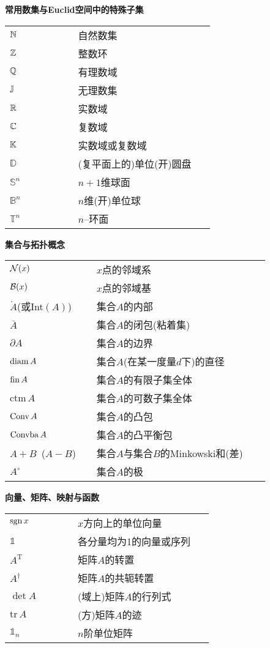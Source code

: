 \textbf{常用数集与Euclid空间中的特殊子集}
\vspace{1.5ex}

\begin{tabular}{p{0.3\linewidth}p{0.6\linewidth}}
    $\mathbb{N}$ & 自然数集\\
    $\mathbb{Z}$ & 整数环\\
    $\mathbb{Q}$ & 有理数域\\
    $\mathbb{J}$ & 无理数集\\
    $\mathbb{R}$ & 实数域\\
    $\mathbb{C}$ & 复数域\\
    $\mathbb{K}$ & 实数域或复数域\\
    $\mathbb{D}$ & (复平面上的)单位(开)圆盘\\
    $\mathbb{S}^n$ & $n+1$维球面\\
    $\mathbb{B}^n$ & $n$维(开)单位球\\
    $\mathbb{T}^n$ & $n$--环面\\
\end{tabular}

\vspace{2.5ex}
\noindent\textbf{集合与拓扑概念}
\vspace{1.5ex}

\begin{tabular}{p{0.3\linewidth}p{0.6\linewidth}}
    $\mathcal{N}(x)$ & $x$点的邻域系\\
    $\mathcal{B}(x)$ & $x$点的邻域基\\
    $\mathring{A}$(或Int$(A)$) & 集合$A$的内部\\
    $\bar{A}$ & 集合$A$的闭包(粘着集)\\
    $\partial A$ & 集合$A$的边界\\
    $\operatorname{diam} A$ & 集合$A$(在某一度量$d$下)的直径\\
    $\operatorname{fin} A$ & 集合$A$的有限子集全体\\
    $\text{ctm}\, A$ & 集合$A$的可数子集全体\\
    $\operatorname{Conv} A$ & 集合$A$的凸包\\
    $\operatorname{Convba} A$ & 集合$A$的凸平衡包\\
    $A+B$\ ($A-B$) & 集合$A$与集合$B$的Minkowski和(差)\\
    $A^\circ$ & 集合$A$的极\\
\end{tabular}

\vspace{2.5ex}
\noindent\textbf{向量、矩阵、映射与函数}
\vspace{1.5ex}

\begin{tabular}{p{0.3\linewidth}p{0.6\linewidth}}
    $\mathrm{sgn}\, x$ & $x$方向上的单位向量\\
    $\mathds{1}$ & 各分量均为1的向量或序列\\
    $A^\mathrm{T}$ & 矩阵$A$的转置\\
    $A^\dagger$ & 矩阵$A$的共轭转置\\
    $\det A$ & (域上)矩阵$A$的行列式\\
    $\mathrm{tr}\,A$ & (方)矩阵$A$的迹\\
    $\mathds{1}_n$ & $n$阶单位矩阵\\
\end{tabular}

